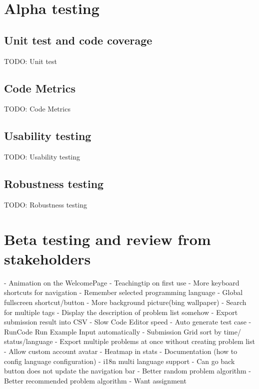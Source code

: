 \documentclass[a4paper]{report}
\begin{document}
\section{Alpha testing}

\subsection{Unit test and code coverage}

TODO: Unit test

\subsection{Code Metrics}

TODO: Code Metrics


\subsection{Usability testing}

TODO: Usability testing

\subsection{Robustness testing}

TODO: Robustness testing

\section{Beta testing and review from stakeholders}

- Animation on the WelcomePage
- Teachingtip on first use
- More keyboard shortcuts for navigation
- Remember selected programming language
- Global fullscreen shortcut/button
- More background picture(bing wallpaper)
- Search for multiple tags
- Display the description of problem list somehow
- Export submission result into CSV
- Slow Code Editor speed
- Auto generate test case
- RunCode Run Example Input automatically
- Submission Grid sort by time/ status/language
- Export multiple problems at once without creating problem list
- Allow custom account avatar
- Heatmap in stats
- Documentation (how to config language configuration)
- i18n multi language support
- Can go back button does not update the navigation bar
- Better random problem algorithm
- Better recommended problem algorithm
- Want assignment
\end{document}
